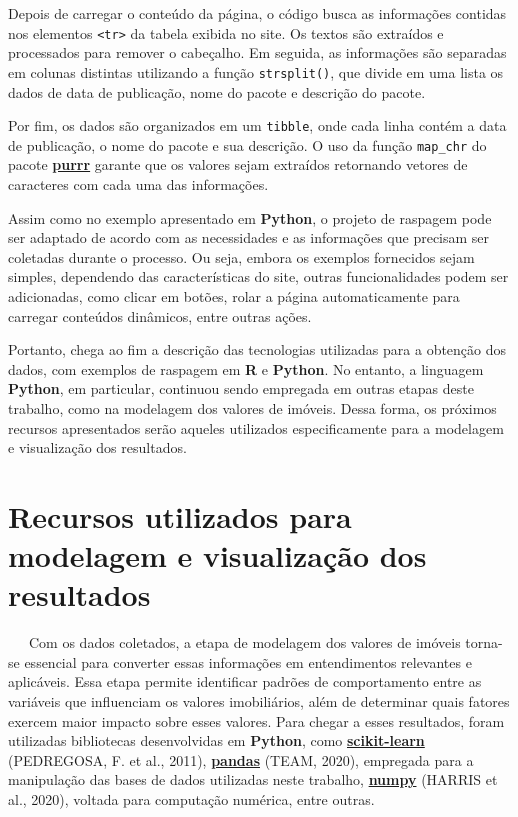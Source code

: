 \documentclass[
  12pt,
  a4paper,
]{scrreprt}
\begin{document}
\vspace{12pt}

Depois de carregar o conteúdo da página, o código busca as informações
contidas nos elementos \texttt{\textless{}tr\textgreater{}} da tabela
exibida no site. Os textos são extraídos e processados para remover o
cabeçalho. Em seguida, as informações são separadas em colunas distintas
utilizando a função \texttt{strsplit()}, que divide em uma lista os
dados de data de publicação, nome do pacote e descrição do pacote.

\vspace{12pt}

Por fim, os dados são organizados em um \texttt{tibble}, onde cada linha
contém a data de publicação, o nome do pacote e sua descrição. O uso da
função \texttt{map\_chr} do pacote
\href{https://purrr.tidyverse.org/}{\textbf{purrr}} garante que os
valores sejam extraídos retornando vetores de caracteres com cada uma
das informações.

\vspace{12pt}

Assim como no exemplo apresentado em \textbf{Python}, o projeto de
raspagem pode ser adaptado de acordo com as necessidades e as
informações que precisam ser coletadas durante o processo. Ou seja,
embora os exemplos fornecidos sejam simples, dependendo das
características do site, outras funcionalidades podem ser adicionadas,
como clicar em botões, rolar a página automaticamente para carregar
conteúdos dinâmicos, entre outras ações.

\vspace{12pt}

Portanto, chega ao fim a descrição das tecnologias utilizadas para a
obtenção dos dados, com exemplos de raspagem em \textbf{R} e
\textbf{Python}. No entanto, a linguagem \textbf{Python}, em particular,
continuou sendo empregada em outras etapas deste trabalho, como na
modelagem dos valores de imóveis. Dessa forma, os próximos recursos
apresentados serão aqueles utilizados especificamente para a modelagem e
visualização dos resultados.

\section{Recursos utilizados para modelagem e visualização dos
resultados}\label{recursos-utilizados-para-modelagem-e-visualizauxe7uxe3o-dos-resultados}

~~~Com os dados coletados, a etapa de modelagem dos valores de imóveis
torna-se essencial para converter essas informações em entendimentos
relevantes e aplicáveis. Essa etapa permite identificar padrões de
comportamento entre as variáveis que influenciam os valores
imobiliários, além de determinar quais fatores exercem maior impacto
sobre esses valores. Para chegar a esses resultados, foram utilizadas
bibliotecas desenvolvidas em \textbf{Python}, como
\href{https://scikit-learn.org/stable/}{\textbf{scikit-learn}}
(PEDREGOSA, F. et al., 2011),
\href{https://pandas.pydata.org/}{\textbf{pandas}} (TEAM, 2020),
empregada para a manipulação das bases de dados utilizadas neste
trabalho, \href{https://numpy.org/}{\textbf{numpy}} (HARRIS et al.,
2020), voltada para computação numérica, entre outras.
\end{document}
